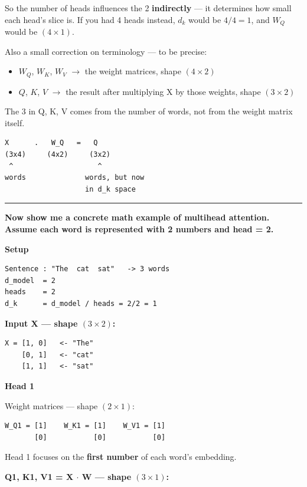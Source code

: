 So the number of heads influences the 2 \textbf{indirectly} --- it determines how small each head's slice is. If you had 4 heads instead, $d_k$ would be $4/4 = 1$, and $W_Q$ would be $(4 \times 1)$.

Also a small correction on terminology --- to be precise:

\begin{itemize}
\item $W_Q$, $W_K$, $W_V$ $\to$ the weight matrices, shape $(4 \times 2)$
\item $Q$, $K$, $V$ $\to$ the result after multiplying X by those weights, shape $(3 \times 2)$
\end{itemize}

The 3 in Q, K, V comes from the number of words, not from the weight matrix itself.

\begin{verbatim}
X      .   W_Q   =   Q
(3x4)     (4x2)     (3x2)
 ^                    ^
words              words, but now
                   in d_k space
\end{verbatim}

\bigskip
\hrule
\bigskip

\textbf{Now show me a concrete math example of multihead attention. Assume each word is represented with 2 numbers and head = 2.}

\medskip

\textbf{Setup}

\begin{verbatim}
Sentence : "The  cat  sat"   -> 3 words
d_model  = 2
heads    = 2
d_k      = d_model / heads = 2/2 = 1
\end{verbatim}

\textbf{Input X --- shape $(3 \times 2)$:}

\begin{verbatim}
X = [1, 0]   <- "The"
    [0, 1]   <- "cat"
    [1, 1]   <- "sat"
\end{verbatim}

\medskip
\textbf{Head 1}

Weight matrices --- shape $(2 \times 1)$:

\begin{verbatim}
W_Q1 = [1]    W_K1 = [1]    W_V1 = [1]
       [0]           [0]           [0]
\end{verbatim}

Head 1 focuses on the \textbf{first number} of each word's embedding.

\textbf{Q1, K1, V1 = X $\cdot$ W --- shape $(3 \times 1)$:}


